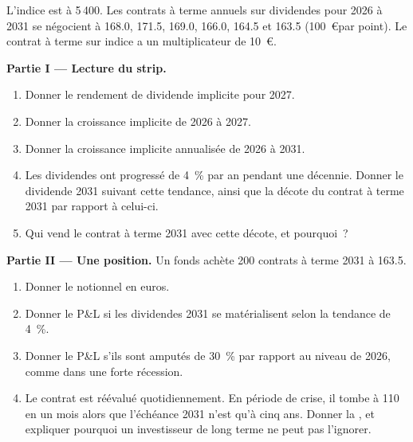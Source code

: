 \begin{problem}\label{pb:m1:index-and-single-stock-futures-worldwide:1}
L'indice est à 5\,400. Les contrats à terme annuels sur dividendes pour 2026 à 2031 se négocient à
168.0, 171.5, 169.0, 166.0, 164.5 et 163.5  (100~\euro par point). Le
contrat à terme sur indice a un multiplicateur de 10~\euro.

\medskip\noindent\textbf{Partie I --- Lecture du strip.}
\begin{enumerate}
\item Donner le rendement de dividende implicite pour 2027.
\item Donner la croissance implicite de 2026 à 2027.
\item Donner la croissance implicite annualisée de 2026 à 2031.
\item Les dividendes ont progressé de 4~\% par an pendant une décennie. Donner le dividende 2031 suivant
cette tendance, ainsi que la décote du contrat à terme 2031 par rapport à celui-ci.
\item Qui vend le contrat à terme 2031 avec cette décote, et pourquoi~?
\end{enumerate}

\medskip\noindent\textbf{Partie II --- Une position.}
Un fonds achète 200 contrats à terme 2031 à 163.5.
\begin{enumerate}[resume]
\item Donner le notionnel en euros.
\item Donner le P\&L si les dividendes 2031 se matérialisent selon la tendance de 4~\%.
\item Donner le P\&L s'ils sont amputés de 30~\% par rapport au niveau de 2026, comme
dans une forte récession.
\item Le contrat est réévalué quotidiennement. En période de crise, il tombe à 110 en un mois
alors que l'échéance 2031 n'est qu'à cinq ans. Donner la , et expliquer pourquoi un
investisseur de long terme ne peut pas l'ignorer.
\end{enumerate}


\end{problem}
